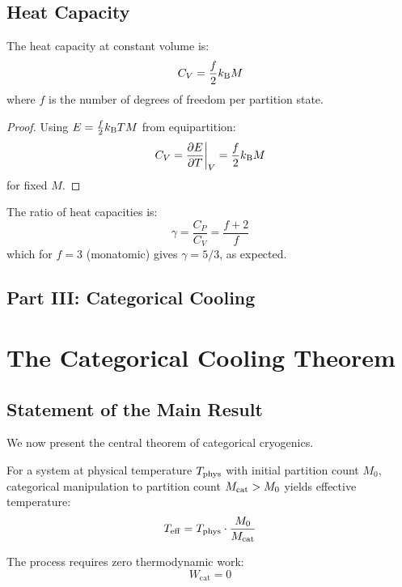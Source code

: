 \subsection{Heat Capacity}

\begin{theorem}
\label{thm:heat_capacity}
The heat capacity at constant volume is:
\begin{equation}
C_V = \frac{f}{2} k_{\mathrm{B}} M
\label{eq:heat_capacity_cv}
\end{equation}
where $f$ is the number of degrees of freedom per partition state.
\end{theorem}

\begin{proof}
Using $E = \frac{f}{2} k_{\mathrm{B}} T M$ from equipartition:
\begin{equation}
C_V = \frac{\partial E}{\partial T}\bigg|_V = \frac{f}{2} k_{\mathrm{B}} M
\end{equation}
for fixed $M$.
\end{proof}

\begin{corollary}
The ratio of heat capacities is:
\begin{equation}
\gamma = \frac{C_P}{C_V} = \frac{f+2}{f}
\end{equation}
which for $f = 3$ (monatomic) gives $\gamma = 5/3$, as expected.
\end{corollary}


\subsection*{Part III: Categorical Cooling}

\section{The Categorical Cooling Theorem}

\subsection{Statement of the Main Result}

We now present the central theorem of categorical cryogenics.

\begin{theorem}
\label{thm:categorical_cooling}
For a system at physical temperature $T_{\mathrm{phys}}$ with initial partition count $M_0$, categorical manipulation to partition count $M_{\mathrm{cat}} > M_0$ yields effective temperature:
\begin{equation}
T_{\mathrm{eff}} = T_{\mathrm{phys}} \cdot \frac{M_0}{M_{\mathrm{cat}}}
\label{eq:cooling_formula}
\end{equation}

The process requires zero thermodynamic work:
\begin{equation}
W_{\text{cat}} = 0
\label{eq:zero_work_cooling}
\end{equation}
\end{theorem}

